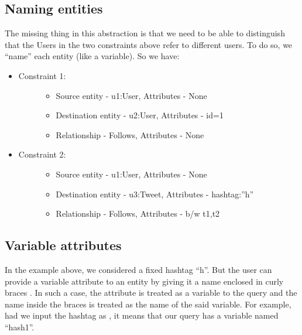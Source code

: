\documentclass[letterpaper,10pt,english]{sphinxmanual}
\begin{document}
\subsection{Naming entities}
\label{\detokenize{neo4j_query_generation:naming-entities}}
The missing thing in this abstraction is that we need to be able to distinguish that the Users in the two constraints above refer to different users. To do so, we “name” each entity (like a variable). So we have:
\begin{itemize}
\item {} \begin{description}
\item[{Constraint 1:}] \leavevmode\begin{itemize}
\item {} 
Source entity - u1:User, Attributes - None

\item {} 
Destination entity - u2:User, Attributes - id=1

\item {} 
Relationship - Follows, Attributes - None

\end{itemize}

\end{description}

\item {} \begin{description}
\item[{Constraint 2:}] \leavevmode\begin{itemize}
\item {} 
Source entity - u1:User, Attributes - None

\item {} 
Destination entity - u3:Tweet, Attributes - hashtag:”h”

\item {} 
Relationship - Follows, Attributes - b/w t1,t2

\end{itemize}

\end{description}

\end{itemize}


\subsection{Variable attributes}
\label{\detokenize{neo4j_query_generation:variable-attributes}}
In the example above, we considered a fixed hashtag “h”. But the user can provide a variable attribute to an entity by giving it a name enclosed in curly braces \sphinxcode{\sphinxupquote{\{\}}}. In such a case, the attribute is treated as a variable to the query and the name inside the braces is treated as the name of the said variable. For example, had we input the hashtag as , it means that our query has a variable named “hash1”.
\end{document}
